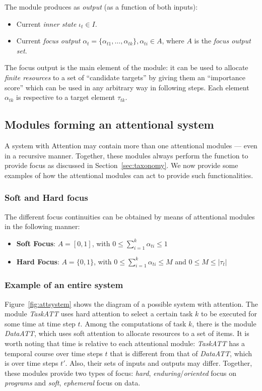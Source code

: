 \documentclass[11pt]{article}
\begin{document}
The module produces as \emph{output} (as a function of both inputs):
\begin{itemize}
    \item Current \emph{inner state} $\iota_t \in I$.
    \item Current \emph{focus output} $\alpha_t = \{\alpha_{t1}, \ldots, \alpha_{tk}\}, \alpha_{ti} \in A$,
        where $A$ is the \emph{focus output set}.
\end{itemize}

The focus output is the main element of the module: it can be used to allocate \emph{finite resources} to a set of ``candidate targets'' by giving them an ``importance score'' which can be used in any arbitrary way in following steps.
Each element $\alpha_{tk}$ is respective to a target element $\tau_{tk}$.

\subsection{Modules forming an attentional system}
A system with Attention may contain more than one attentional modules --- even in a recursive manner.
Together, these modules always perform the function to provide focus
as discussed in Section~\ref{sec:taxonomy}.
We now provide some examples of how the attentional modules can act to provide such functionalities.

\subsubsection{Soft and Hard focus}
The different focus continuities can be obtained by means of attentional modules in the following manner:
\begin{itemize}
    \item \textbf{Soft Focus}:
        $A = [0, 1]$, with $0 \le \sum_{i=1}^{k} \alpha_{ti} \le 1$
    \item \textbf{Hard Focus}:
        $A = \{0, 1\}$, with $0 \le \sum_{i=1}^{k} \alpha_{ti} \le M$ and $0 \le M \le |\tau_t|$
\end{itemize}

\subsubsection{Example of an entire system}
Figure~\ref{fig:attsystem} shows the diagram of a possible system with attention.
The module \emph{TaskATT} uses hard attention to select a certain task $k$ to be executed for some time at time step $t$.
Among the computations of task $k$, there is the module \emph{DataATT}, which uses soft attention to allocate resources to a set of items.
It is worth noting that time is relative to each attentional module: \emph{TaskATT} has a temporal course over time steps $t$ that is different from that of \emph{DataATT}, which is over time steps $t'$.
Also, their sets of inputs and outputs may differ.
Together, these modules provide two types of focus:
\emph{hard}, \emph{enduring}/\emph{oriented} focus on \emph{programs} and
\emph{soft}, \emph{ephemeral} focus on data.
\end{document}
